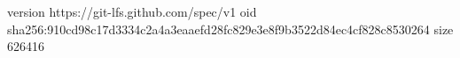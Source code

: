 version https://git-lfs.github.com/spec/v1
oid sha256:910cd98c17d3334c2a4a3eaaefd28fc829e3e8f9b3522d84ec4cf828c8530264
size 626416
